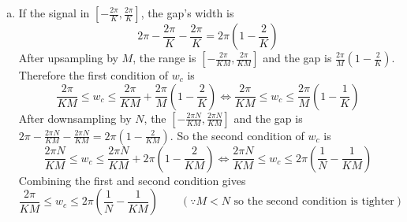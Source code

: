 \begin{enumerate}[(a)]
\item If the signal in $[-\frac{2\pi}{K},\frac{2\pi}{K}]$, the gap's width is 
\[2\pi - \frac{2\pi}{K} -\frac{2\pi}{K} = 2\pi(1-\frac{2}{K})\]
After upsampling by $M$, the range is $[-\frac{2\pi}{KM},\frac{2\pi}{KM}]$ and the gap is $\frac{2\pi}{M} (1-\frac{2}{K})$. Therefore the first condition of $w_c$ is 
\[\frac{2\pi}{KM} \leq w_c \leq \frac{2\pi}{KM} + \frac{2\pi}{M} (1-\frac{2}{K}) \Leftrightarrow \frac{2\pi}{KM} \leq w_c \leq \frac{2\pi}{M} (1-\frac{1}{K})\]
After downsampling by $N$, the $[-\frac{2\pi N}{KM},\frac{2\pi N}{KM}]$ and the gap is $2\pi - \frac{2\pi N}{KM} - \frac{2\pi N}{KM} = 2\pi(1-\frac{2}{KM})$. So the second condition of $w_c$ is
\[ \frac{2\pi N}{KM} \leq w_c \leq \frac{2\pi N}{KM} + 2\pi(1-\frac{2}{KM}) \Leftrightarrow \frac{2\pi N}{KM} \leq w_c \leq 2\pi(\frac{1}{N} - \frac{1}{KM}) \]
Combining the first and second condition gives
\[ \frac{2\pi}{KM} \leq w_c \leq 2\pi(\frac{1}{N} - \frac{1}{KM}) \qquad (\because M<N\text{ so the second condition is tighter})\]
\end{enumerate}